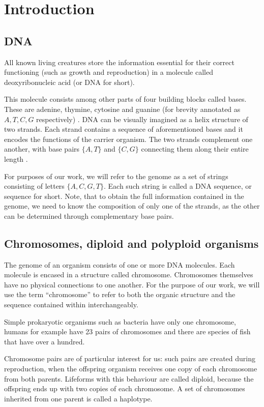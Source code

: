 \chapter*{Introduction}


\section{DNA}


All known living creatures store the information essential for their correct functioning (such as growth and reproduction) in a molecule called deoxyribonucleic acid (or DNA for short).

This molecule consists among other parts of four building blocks called bases. These are adenine, thymine, cytosine and guanine (for brevity annotated as $A, T, C, G$ respectively) . DNA can be visually imagined as a helix structure of two strands. Each strand contains a sequence of aforementioned bases and it encodes the functions of the carrier organism. The two strands complement one another, with base pairs $\{A, T\}$ and $\{C, G\}$ connecting them along their entire length \cite{wiki:dna}.

For purposes of our work, we will refer to the genome as a set of strings consisting of letters $\{A, C, G, T\}$. Each such string is called a DNA sequence, or sequence for short. Note, that to obtain the full information contained in the genome, we need to know the composition of only one of the strands, as the other can be determined through complementary base pairs.

\section{Chromosomes, diploid and polyploid organisms}

The genome of an organism consists of one or more DNA molecules. Each molecule is encased in a structure called chromosome. Chromosomes themselves have no physical connections to one another. For the purpose of our work, we will use the term “chromosome” to refer to both the organic structure and the sequence contained within interchangeably.

Simple prokaryotic organisms such as bacteria have only one chromosome, humans for example have 23 pairs of chromosomes and there are species of fish that have over a hundred.

Chromosome pairs are of particular interest for us: such pairs are created during reproduction, when the offspring organism receives one copy of each chromosome from both parents. Lifeforms with this behaviour are called diploid, because the offspring ends up with two copies of each chromosome. A set of chromosomes inherited from one parent is called a haplotype.

